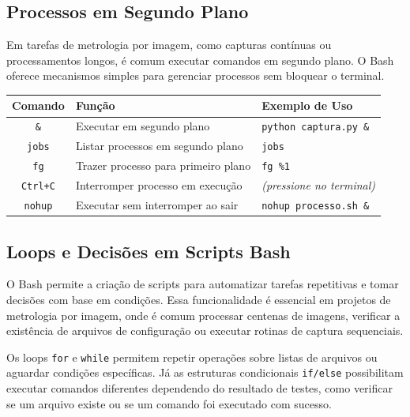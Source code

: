 \documentclass[12pt]{article}
\begin{document}
\subsection{Processos em Segundo Plano}

Em tarefas de metrologia por imagem, como capturas contínuas ou processamentos longos, é comum executar comandos em segundo plano. O Bash oferece mecanismos simples para gerenciar processos sem bloquear o terminal.

\begin{cmdbox}
\begin{tabularx}{\linewidth}{@{}C >{\raggedright\arraybackslash}X >{\raggedright\arraybackslash}X@{}}
\toprule
\textbf{Comando} & \textbf{Função} & \textbf{Exemplo de Uso} \\
\midrule
\texttt{\&} & Executar em segundo plano & \texttt{python captura.py \&} \\
\texttt{jobs} & Listar processos em segundo plano & \texttt{jobs} \\
\texttt{fg} & Trazer processo para primeiro plano & \texttt{fg \%1} \\
\texttt{Ctrl+C} & Interromper processo em execução & \textit{(pressione no terminal)} \\
\texttt{nohup} & Executar sem interromper ao sair & \texttt{nohup processo.sh \&} \\
\bottomrule
\end{tabularx}
\end{cmdbox}

\subsection{Loops e Decisões em Scripts Bash}

O Bash permite a criação de scripts para automatizar tarefas repetitivas e tomar decisões com base em condições. Essa funcionalidade é essencial em projetos de metrologia por imagem, onde é comum processar centenas de imagens, verificar a existência de arquivos de configuração ou executar rotinas de captura sequenciais.

Os loops \texttt{for} e \texttt{while} permitem repetir operações sobre listas de arquivos ou aguardar condições específicas. Já as estruturas condicionais \texttt{if/else} possibilitam executar comandos diferentes dependendo do resultado de testes, como verificar se um arquivo existe ou se um comando foi executado com sucesso.
\end{document}
